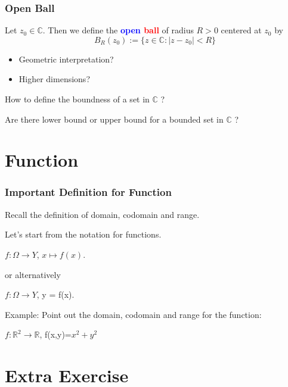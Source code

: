 \documentclass{beamer}
\begin{document}
\begin{frame}
    \frametitle{Open Ball}
    Let $z_0 \in \mathbb{C}$. Then we define the \textbf{\textcolor{blue}{open} \textcolor{red}{ball}} of radius
    $R>0$ centered at $z_0$ by
    $$B_R(z_0):=\{z \in \mathbb{C} :|z-z_0|<R\}$$

    \begin{itemize}
        \item Geometric interpretation?
        \item Higher dimensions?
    \end{itemize}

    How to define the boundness of a set in $\mathbb{C}$ ?

    Are there lower bound or upper bound for a bounded set in $\mathbb{C}$ ?

\end{frame}

\section{Function}
\begin{frame}
    \frametitle{Important Definition for Function}
    Recall the definition of domain, codomain and range.

    \vspace{1em}
    Let's start from the notation for functions.

    \vspace{1em}
    \begin{center}
        $f:\varOmega \rightarrow Y$, \qquad $x\mapsto f(x)$.

        \vspace{1em}
        or alternatively

        \vspace{1em}
        $f:\varOmega \rightarrow Y$, \qquad y = f(x).
    \end{center}

    Example: Point out the domain, codomain and range for the function:

    \begin{center}
        $f:\mathbb{R}^2 \rightarrow \mathbb{R}$, \qquad  f(x,y)=$x^{2}+y^{2}$
    \end{center}
\end{frame}


\section{Extra Exercise}
\end{document}
